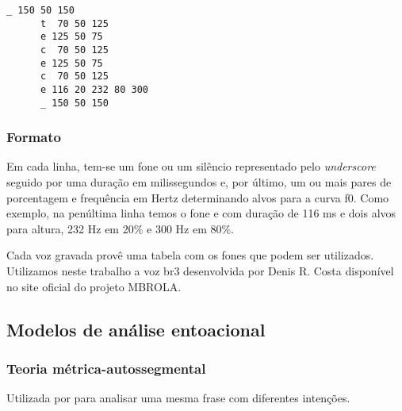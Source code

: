 \begin{lstlisting}[caption=Exemplo de arquivo de entrada para MBROLA]
      _ 150 50 150
      t  70 50 125
      e 125 50 75
      c  70 50 125
      e 125 50 75
      c  70 50 125
      e 116 20 232 80 300
      _ 150 50 150
\end{lstlisting}

\subsubsection{Formato}
Em cada linha, tem-se um fone ou um silêncio representado pelo \emph{underscore} seguido por uma duração em milissegundos e, por último, um ou mais pares de porcentagem e frequência em Hertz determinando alvos para a curva f0. Como exemplo, na penúltima linha temos o fone \/e\/ com duração de 116 ms e dois alvos para altura, 232 Hz em 20\% e 300 Hz em 80\%.

Cada voz gravada provê uma tabela com os fones que podem ser utilizados. Utilizamos neste trabalho a voz br3 desenvolvida por Denis R. Costa disponível no site oficial do projeto MBROLA.

\subsection{Modelos de análise entoacional}
\subsubsection{Teoria métrica-autossegmental}
Utilizada por  para analisar uma mesma frase com diferentes intenções.

